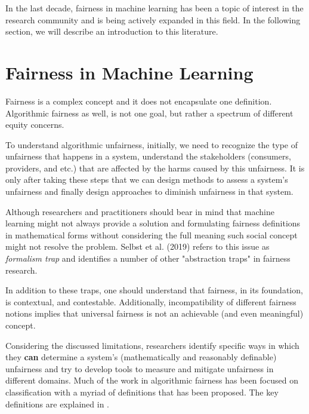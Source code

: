     In the last decade, fairness in machine learning has been a topic of interest in the research community and is being actively expanded in this field. In the following section, we will describe an introduction to this literature.

\section{Fairness in Machine Learning}
\label{sec:fair_ml}
    
    Fairness is a complex concept and it does not encapsulate one definition. Algorithmic fairness as well, is not one goal, but rather a spectrum of different equity concerns.
    
    To understand algorithmic unfairness, initially, we need to recognize the type of unfairness that happens in a system, understand the stakeholders (consumers, providers, and etc.) that are affected by the harms caused by this unfairness. It is only after taking these steps that we can design methods to assess a system's unfairness and finally design approaches to diminish unfairness in that system.
    
    Although researchers and practitioners should bear in mind that machine learning might not always provide a solution and formulating fairness definitions in mathematical forms without considering the full meaning such social concept might not resolve the problem. Selbst et al. (2019) \cite{selbst2019fairness} refers to this issue as \textit{formalism trap} and identifies a number of other "abstraction traps" in fairness research.
    
    In addition to these traps, one should understand that fairness, in its foundation, is contextual, and contestable. Additionally, incompatibility of different fairness notions \cite{friedler-impossibility-2021} implies that universal fairness is not an achievable (and even meaningful) concept.
    
    Considering the discussed limitations, researchers identify specific ways in which they \textbf{can} determine a system's (mathematically and reasonably definable) unfairness and try to develop tools to measure and mitigate unfairness in different domains. Much of the work in algorithmic fairness has been focused on classification with a myriad of definitions that has been proposed. The key definitions are explained in \cite{mitchell2021algorithmic,barocas2016big,barocas2018fairness}.
    
